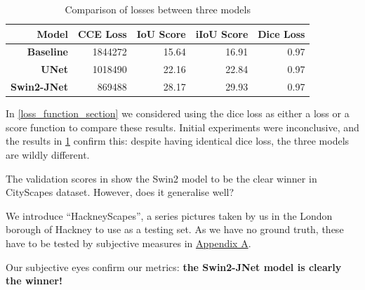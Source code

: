 \begin{table}[h]
	\centering
	\begin{tabular}{>{\bfseries}r | r r r r}
		\toprule
		Model & CCE Loss & IoU Score & iIoU Score & Dice Loss \\
		\midrule
		Baseline & \num{1844272} & 15.64 & 16.91 & 0.97 \\
		UNet & \num{1018490} & 22.16 & 22.84 & 0.97 \\
		Swin2-JNet & \num{869488} & 28.17 & 29.93 & 0.97 \\
		\bottomrule
	\end{tabular}
	\caption{Comparison of losses between three models}
	\label{result_scores}
\end{table}

In \cref{loss_function_section} we considered using the dice loss as either a loss or a score function to compare these results.
Initial experiments were inconclusive, and the results in \cref{result_scores} confirm this: despite having identical dice loss, the three models are wildly different.

The validation scores in \label{result_scores} show the Swin2 model to be the clear winner in CityScapes dataset.
However, does it generalise well?

We introduce ``HackneyScapes'', a series pictures taken by us in the London borough of Hackney to use as a testing set.
As we have no ground truth, these have to be tested by subjective measures in \hyperref[hackneyscapes]{Appendix A}.

Our subjective eyes confirm our metrics: \textbf{the Swin2-JNet model is clearly the winner!}

